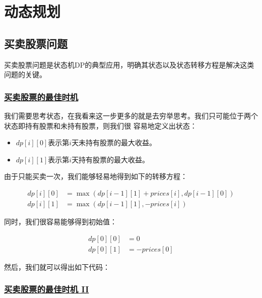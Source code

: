 \documentclass[../../main.tex]{subfiles}
\begin{document}
\setchapterpreamble[u]{\margintoc}

\chapter{动态规划}

\section{买卖股票问题}

买卖股票问题是状态机DP的典型应用，明确其状态以及状态转移方程是解决这类问题的关键。

\subsection{\href{https://leetcode.cn/problems/best-time-to-buy-and-sell-stock/}{买卖股票的最佳时机}}

我们需要思考状态，在我看来这一步更多的就是去穷举思考。我们只可能位于两个状态即持有股票和未持有股票，则我们很
容易地定义出状态：

\begin{itemize}
  \item $dp[i][0]$表示第$i$天未持有股票的最大收益。
  \item $dp[i][1]$表示第$i$天持有股票的最大收益。
\end{itemize}

由于只能买卖一次，我们能够轻易地得到如下的转移方程：

\begin{align*}
  dp[i][0] &= \max(dp[i - 1][1] + prices[i], dp[i - 1][0]) \\
  dp[i][1] &= \max(dp[i - 1][1], -prices[i])
\end{align*}

同时，我们很容易能够得到初始值：

\begin{align*}
  dp[0][0] &= 0 \\
  dp[0][1] &= -prices[0]
\end{align*}

然后，我们就可以得出如下代码：



\subsection{\href{https://leetcode-cn.com/problems/best-time-to-buy-and-sell-stock-ii/}{买卖股票的最佳时机 II}}
\end{document}
